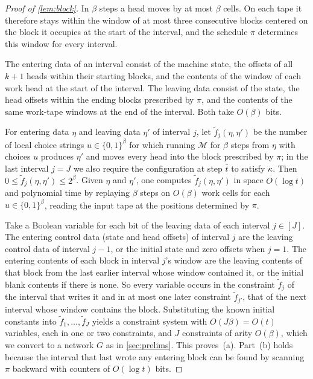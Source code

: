 \documentclass[11pt]{article}
\theoremstyle{definition}
\theoremstyle{definition}
\theoremstyle{remark}
\begin{document}
\begin{proof}[Proof of \cref{lem:block}]
In $\beta$ steps a head moves by at most $\beta$ cells. On each tape it therefore stays within the window of at most three consecutive blocks centered on the block it occupies at the start of the interval, and the schedule $\pi$ determines this window for every interval.

The entering data of an interval consist of the machine state, the offsets of all $k+1$ heads within their starting blocks, and the contents of the window of each work head at the start of the interval. The leaving data consist of the state, the head offsets within the ending blocks prescribed by $\pi$, and the contents of the same work-tape windows at the end of the interval. Both take $O(\beta)$ bits.

For entering data $\eta$ and leaving data $\eta'$ of interval $j$, let $\tilde f_j(\eta,\eta')$ be the number of local choice strings $u\in\{0,1\}^\beta$ for which running $\mathcal M$ for $\beta$ steps from $\eta$ with choices $u$ produces $\eta'$ and moves every head into the block prescribed by $\pi$; in the last interval $j=J$ we also require the configuration at step $\bar t$ to satisfy $\kappa$. Then $0\le\tilde f_j(\eta,\eta')\le2^\beta$. Given $\eta$ and $\eta'$, one computes $\tilde f_j(\eta,\eta')$ in space $O(\log t)$ and polynomial time by replaying $\beta$ steps on $O(\beta)$ work cells for each $u\in\{0,1\}^\beta$, reading the input tape at the positions determined by $\pi$.

Take a Boolean variable for each bit of the leaving data of each interval $j\in[J]$. The entering control data (state and head offsets) of interval $j$ are the leaving control data of interval $j-1$, or the initial state and zero offsets when $j=1$. The entering contents of each block in interval $j$'s window are the leaving contents of that block from the last earlier interval whose window contained it, or the initial blank contents if there is none. So every variable occurs in the constraint $\tilde f_j$ of the interval that writes it and in at most one later constraint $\tilde f_{j'}$, that of the next interval whose window contains the block. Substituting the known initial constants into $\tilde f_1,\dots,\tilde f_J$ yields a constraint system with $O(J\beta)=O(t)$ variables, each in one or two constraints, and $J$ constraints of arity $O(\beta)$, which we convert to a network $G$ as in \cref{sec:prelims}. This proves~(a). Part~(b) holds because the interval that last wrote any entering block can be found by scanning $\pi$ backward with counters of $O(\log t)$ bits.


\end{proof}
\end{document}
